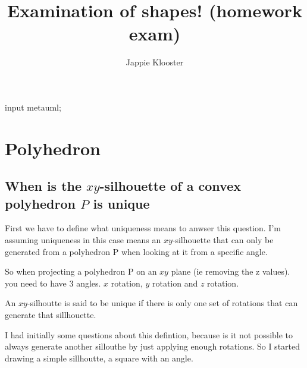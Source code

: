 \documentclass{article}
\begin{document}
\begin{empfile}
\begin{empcmds}
input metauml;
\end{empcmds}
\author{Jappie Klooster}
\title{Examination of shapes! (homework exam)}
\maketitle

\section{Polyhedron}

\subsection{When is the $xy$-silhouette of a convex polyhedron $P$ is unique}
First we have to define what uniqueness means to anwser this question. I'm 
assuming uniqueness in this case means an $xy$-silhouette that can only be
generated from a polyhedron P when looking at it from a specific angle.

So when projecting a polyhedron P on an $xy$ plane (ie removing the z values).
you need to have 3 angles. $x$ rotation, $y$ rotation and $z$ rotation.

An $xy$-silhoutte is said to be unique if there is only one set of rotations
that can generate that sillhouette.

I had initially some questions about this defintion, because is it not possible
to always generate another sillouthe by just applying enough rotations.
So I started drawing a simple sillhoutte, a square with an angle.

\begin{figure}
\end{figure}
\end{empfile}
\end{document}

